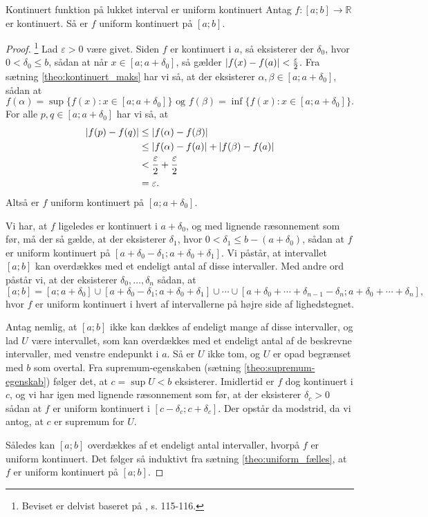 \begin{theorem}[label=theo:kontinuert_uniform]{Kontinuert funktion på lukket interval er uniform kontinuert}{}
  Antag $f:[a;b]\to \mathbb{R}$ er kontinuert. 
  Så er $f$ uniform kontinuert på $[a;b]$.
\end{theorem}
\begin{proof} 
  \footnote{Beviset er delvist baseret på \cite{Clausen1993}, s. 115-116.} 
Lad $\varepsilon >0$ være givet. 
  Siden $f$ er kontinuert i $a$, så eksisterer der $\delta_0$, hvor $0<\delta_0 \leq b$, sådan at når $x \in [a;a+\delta_0 ]$, så gælder $\abs{f(x)-f(a)} < \frac{\varepsilon }{2} $.
  Fra sætning \ref{theo:kontinuert_maks} har vi så, at der eksisterer $\alpha , \beta \in [a;a+\delta_0 ]$, sådan at
  \[
  f(\alpha )=\sup \{ f(x):x \in [a;a+\delta_0 ] \} \text{ og } f(\beta )= \inf \{ f(x):x \in [a;a+\delta_0 ] \}.
  \] 
  For alle $p, q \in [a;a+\delta_0 ]$ har vi så, at
  \begin{equation*}
  \begin{split}
    \abs{f(p)-f(q)} &\leq \abs{f(\alpha )-f(\beta )} \\
    &\leq \abs{f(\alpha )-f(a)} + \abs{f(\beta ) - f(a)} \\
    &<\frac{\varepsilon }{2} + \frac{\varepsilon }{2}\\
    &=\varepsilon.
  \end{split}
  \end{equation*}
  Altså er $f$ uniform kontinuert på $[a;a+\delta_0 ]$.

  Vi har, at $f$ ligeledes er kontinuert i $a + \delta _0$, og med lignende ræsonnement som før, må der så gælde, at der eksisterer $\delta _1$, hvor $0<\delta _1 \leq b-(a+\delta _0)$, sådan at $f$ er uniform kontinuert på $[a+\delta _0-\delta_1;a+\delta_0 + \delta_1]$. 
  Vi påstår, at intervallet $[a;b]$ kan overdækkes med et endeligt antal af disse intervaller. 
  Med andre ord påstår vi, at der eksisterer $\delta _0, \ldots , \delta _n$ sådan, at 
  \[
  [a;b]=[a;a+\delta_0 ] \cup [a+\delta _0-\delta_1;a+\delta_0 + \delta_1] \cup \cdots \cup [a+\delta _0+\cdots +\delta _{n-1}-\delta _n;a+\delta _0+\cdots +\delta _{n}],
  \] 
  hvor $f$ er uniform kontinuert i hvert af intervallerne på højre side af lighedstegnet. 

  Antag nemlig, at $[a;b]$ ikke kan dækkes af endeligt mange af disse intervaller, og lad $U$ være intervallet, som kan overdækkes med et endeligt antal af de beskrevne intervaller, med venstre endepunkt i $a$. 
Så er $U$ ikke tom, og $U$ er opad begrænset med $b$ som overtal. 
  Fra supremum-egenskaben (sætning \ref{theo:supremum-egenskab}) følger det, at $c=\sup U<b$ eksisterer. 
  Imidlertid er $f$ dog kontinuert i $c$, og vi har igen med lignende ræsonnement som før, at der eksisterer $\delta _c>0$ sådan at $f$ er uniform kontinuert i $[c-\delta _c;c+\delta _c]$. 
  Der opstår da modstrid, da vi antog, at $c$ er supremum for $U$. 

Således kan $[a;b]$ overdækkes af et endeligt antal intervaller, hvorpå $f$ er uniform kontinuert.
  Det følger så induktivt fra sætning \ref{theo:uniform_fælles}, at $f$ er uniform kontinuert på $[a;b]$.
\end{proof}

